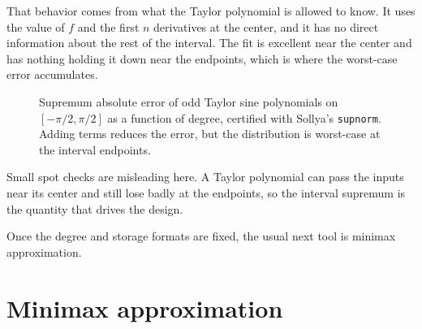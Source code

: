 \documentclass[manuscript, nonacm]{acmart}
\newcommand{\approxdata}[1]{docs/approximating_functions/data/#1}
\begin{document}
    That behavior comes from what the Taylor polynomial is allowed to know. It
    uses the value of $f$ and the first $n$ derivatives at the center, and it has
    no direct information about the rest of the interval. The fit is excellent
    near the center and has nothing holding it down near the endpoints, which is
    where the worst-case error accumulates.

    \begin{figure}[tbp]
        \centering
        \caption[Supremum absolute error of odd Taylor sine polynomials]{Supremum\protect\footnotemark{} absolute error of odd Taylor sine polynomials on
            $[-\pi/2,\pi/2]$ as a function of degree, certified with Sollya's
            \texttt{supnorm}. Adding terms reduces the error, but the distribution
            is worst-case at the interval endpoints.}
    \end{figure}

    Small spot checks are misleading here. A Taylor polynomial can pass the
    inputs near its center and still lose badly at the endpoints, so the interval
    supremum is the quantity that drives the design.

    Once the degree and storage formats are fixed, the usual next tool is minimax
    approximation.



    \section{Minimax approximation}
\end{document}
